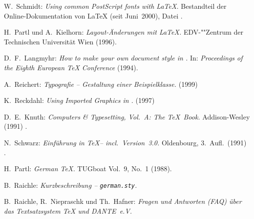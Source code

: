 \documentclass[11pt,a4paper]{article} %
\begin{document}
\begin{thebibliography}{99}
W.~Schmidt: \textit{Using common PostScript fonts with \LaTeX.}
Bestandteil der Online-Dokumentation von \LaTeX{}
(seit Juni~2000), Datei . 

H.~Partl und A.~Kielhorn: \textit{Layout-Änderungen mit \LaTeX.}
EDV-""Zentrum der Technischen Universität Wien (1996).\\

D.~F.~Langmyhr: \textit{How to make your own document style in \LaTeXe.}
In: \textit{Proceedings of the Eighth European \TeX{} Conference}
(1994).

 A.~Reichert: \textit{Typografie -- Gestaltung einer 
Beispielklasse.} (1999)\\

K.~Reckdahl: \textit{Using Imported Graphics in \LaTeXe.} (1997)\\

D.~E.~Knuth: \textit{Computers \& Typesetting, Vol.\ A: The \TeX{}~Book.}
Addison-Wesley (1991)%
.

N.~Schwarz: \textit{Einführung in \TeX -- incl.\ Version~3.0.}
Oldenbourg, 3.~Aufl.\ (1991)%
.
 
H.~Partl: \textit{German \TeX.} TUG\-boat Vol.~9, No.~1 (1988).
 
B.~Raichle:
\textit{Kurzbeschreibung -- \texttt{german.sty}.}\\

B.~Raichle, R.~Niepraschk und Th.~Hafner:
\textit{Fragen und Antworten (FAQ) über das Textsatzsystem \TeX{} und 
DANTE~e.V.} \\

\end{thebibliography}
\cleardoublepage


 
\end{document}
